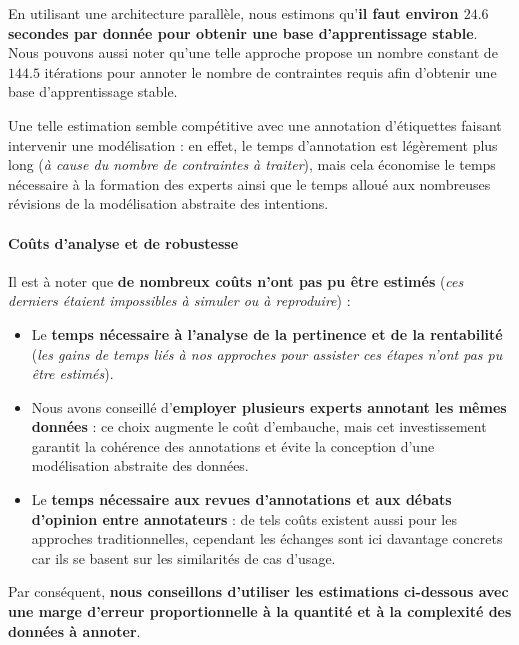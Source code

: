 			En utilisant une architecture parallèle, nous estimons qu'\textbf{il faut environ $24.6$ secondes par donnée pour obtenir une base d'apprentissage stable}.
			Nous pouvons aussi noter qu'une telle approche propose un nombre constant de $144.5$ itérations pour annoter le nombre de contraintes requis afin d'obtenir une base d'apprentissage stable.
			
			Une telle estimation semble compétitive avec une annotation d'étiquettes faisant intervenir une modélisation : en effet, le temps d'annotation est légèrement plus long (\textit{à cause du nombre de contraintes à traiter}), mais cela économise le temps nécessaire à la formation des experts ainsi que le temps alloué aux nombreuses révisions de la modélisation abstraite des intentions.
		
		
		\paragraph{\textcolor{colorSilverLakeBlue}{\faCheckSquare} Coûts d'analyse et de robustesse}
			
			Il est à noter que \textbf{de nombreux coûts n'ont pas pu être estimés} (\textit{ces derniers étaient impossibles à simuler ou à reproduire}) :
			\begin{itemize}
				\item Le \textbf{temps nécessaire à l'analyse de la pertinence et de la rentabilité}
				(\textit{les gains de temps liés à nos approches pour assister ces étapes n'ont pas pu être estimés}).
				\item Nous avons conseillé d'\textbf{employer plusieurs experts annotant les mêmes données} : ce choix augmente le coût d'embauche, mais cet investissement garantit la cohérence des annotations et évite la conception d'une modélisation abstraite des données.
				\item Le \textbf{temps nécessaire aux revues d'annotations et aux débats d'opinion entre annotateurs} : de tels coûts existent aussi pour les approches traditionnelles, cependant les échanges sont ici davantage concrets car ils se basent sur les similarités de cas d'usage.
			\end{itemize}
			
			Par conséquent, \textbf{nous conseillons d'utiliser les estimations ci-dessous avec une marge d'erreur proportionnelle à la quantité et à la complexité des données à annoter}.
			
